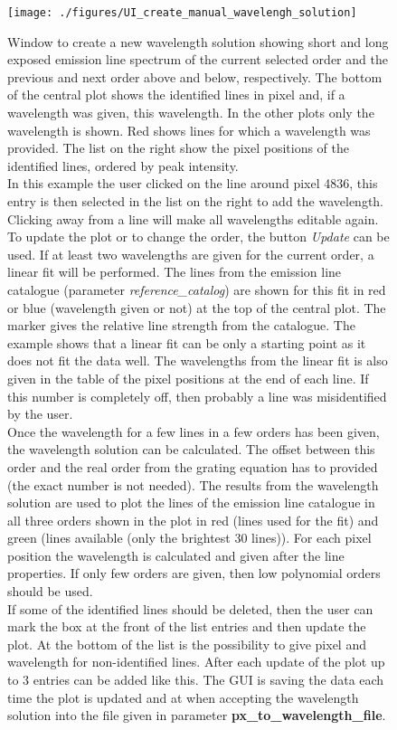 \documentclass[10pt,a4paper]{article}
\begin{document}
\begin{figure} 
  \begin{center}
    \texttt{[image: ./figures/UI\_create\_manual\_wavelengh\_solution]}
  \end{center} 
  \caption{Window to create a new wavelength solution showing short and long exposed emission line spectrum of the current selected order and the previous and next order above and below, respectively. The bottom of the central plot shows the identified lines in pixel and, if a wavelength was given, this wavelength. In the other plots only the wavelength is shown. Red shows lines for which a wavelength was provided. The list on the right show the pixel positions of the identified lines, ordered by peak intensity. \\
    In this example the user clicked on the line around pixel 4836, this entry is then selected in the list on the right to add the wavelength. Clicking away from a line will make all wavelengths editable again. \\
    To update the plot or to change the order, the button \textit{Update} can be used. If at least two wavelengths are given for the current order, a linear fit will be performed. The lines from the emission line catalogue (parameter \textit{reference\_catalog}) are shown for this fit in red or blue (wavelength given or not) at the top of the central plot. The marker gives the relative line strength from the catalogue. The example shows that a linear fit can be only a starting point as it does not fit the data well. The wavelengths from the linear fit is also given in the table of the pixel positions at the end of each line. If this number is completely off, then probably a line was misidentified by the user. \\
    Once the wavelength for a few lines in a few orders has been given, the wavelength solution can be calculated. The offset between this order and the real order from the grating equation has to provided (the exact number is not needed). The results from the wavelength solution are used to plot the lines of the emission line catalogue in all three orders shown in the plot in red (lines used for the fit) and green (lines available (only the brightest 30 lines)). For each pixel position the wavelength is calculated and given after the line properties. If only few orders are given, then low polynomial orders should be used. \\
    If some of the identified lines should be deleted, then the user can mark the box at the front of the list entries and then update the plot. At the bottom of the list is the possibility to give pixel and wavelength for non-identified lines. After each update of the plot up to 3 entries can be added like this. The GUI is saving the data each time the plot is updated and at when accepting the wavelength solution into the file given in parameter \textbf{px\_to\_wavelength\_file}. \\
    \label{Fig:UI_create_manual_wavelengh_solution}}
\end{figure}
\end{document}

